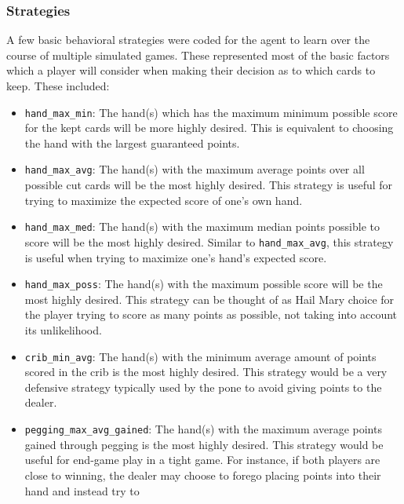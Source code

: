 
\subsubsection{Strategies}
\label{sec:dm-methods-strategies}


A few basic behavioral strategies were coded for the agent to learn
over the course of multiple simulated games.
%
These represented most of the basic factors which a player will consider when
making their decision as to which cards to keep.
%
These included:
\begin{itemize}
\item \texttt{hand\_max\_min}:
	The hand(s) which has the maximum minimum possible score for the kept cards
	will be more highly desired.
	This is equivalent to choosing the hand with the largest guaranteed points.
\item \texttt{hand\_max\_avg}:
	The hand(s) with the maximum average points over all possible cut cards will
	be the most highly desired.
	This strategy is useful for trying to maximize the expected score of one's
	own hand.
\item \texttt{hand\_max\_med}:
	The hand(s) with the maximum median points possible to score will be the most
	highly desired.
	Similar to \texttt{hand\_max\_avg}, this strategy is useful when trying to
	maximize one's hand's expected score.
\item \texttt{hand\_max\_poss}:
	The hand(s) with the maximum possible score will be the most highly desired.
	This strategy can be thought of as Hail Mary choice for the player trying to
	score as many points as possible, not taking into account its unlikelihood.
\item \texttt{crib\_min\_avg}:
	The hand(s) with the minimum average amount of points scored in the crib is
	the most highly desired.
	This strategy would be a very defensive strategy typically used by the pone
	to avoid giving points to the dealer.
\item \texttt{pegging\_max\_avg\_gained}:
	The hand(s) with the maximum average points gained through pegging is the most
	highly desired.
	This strategy would be useful for end-game play in a tight game.
	For instance, if both players are close to winning, the dealer may
	choose to forego placing points into their hand and instead try to

\end{itemize}
